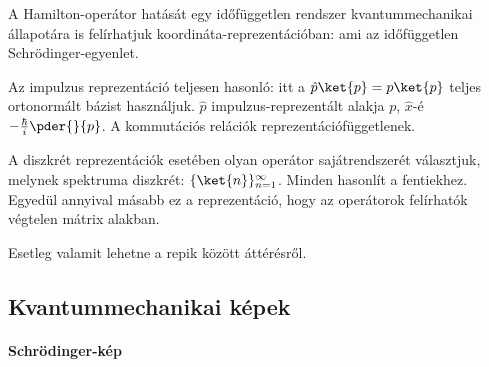    A Hamilton-operátor hatását egy időfüggetlen rendszer kvantummechanikai állapotára is felírhatjuk koordináta-reprezentációban:
   ami az időfüggetlen Schrödinger-egyenlet. 
   
   Az impulzus reprezentáció teljesen hasonló: itt a $\hat{p}\ket{p}=p\ket{p}$ teljes ortonormált bázist használjuk. $\hat{p}$ impulzus-reprezentált alakja $p$, $\hat{x}$-é $-\frac{\hbar}{i}\pder{}{p}$.
   A kommutációs relációk reprezentációfüggetlenek. 
   
   A diszkrét reprezentációk esetében olyan operátor sajátrendszerét választjuk, melynek spektruma diszkrét: $\{\ket{n}\}_{n=1}^{\infty}$.
   Minden hasonlít a fentiekhez.
   Egyedül annyival másabb ez a reprezentáció, hogy az operátorok felírhatók végtelen mátrix alakban. 
   
   {\color{red} Esetleg valamit lehetne a repik között áttérésről.}
   
  \subsection{Kvantummechanikai képek}
   
   \paragraph{Schrödinger-kép}
    
